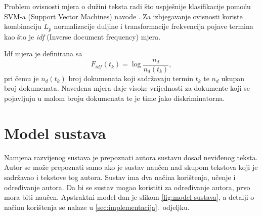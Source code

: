 \documentclass[11pt,english]{article}
\begin{document}
\begin{multicols}{2}
Problem ovisnosti mjera o dužini teksta radi što uspješnije klasifikacije pomoću
SVM-a (Support Vector Machines) navode \citet{diederich2003authorship}.
Za izbjegavanje ovisnosti koriste kombinaciju $L_p$ normalizacije duljine i
transformacije frekvencija pojave termina kao što je
\emph{idf} (Inverse document frequency) mjera.

Idf mjera je definirana sa
\begin{equation}
F_{idf}(t_k) = \log \frac{n_d}{n_d(t_k)},
\label{equ:idf}
\end{equation}
pri čemu je $n_d(t_k)$ broj dokumenata koji sadržavaju termin $t_k$ te $n_d$
ukupan broj dokumenata. Navedena mjera daje visoke vrijednosti za dokumente koji
se pojavljuju u malom broju dokumenata te je time jako diskriminatorna. 


\section{Model sustava}
Namjena razvijenog sustava je prepoznati autora sustavu dosad neviđenog teksta.
Autor se može prepoznati samo ako je sustav naučen nad skupom tekstova koji je
sadržavao i tekstove tog autora. Sustav ima dva načina korištenja, učenje i
određivanje autora. Da bi se sustav mogao koristiti za određivanje autora, prvo
mora biti naučen. Apstraktni model dan je slikom \ref{fig:model-sustava}, a
detalji o načinu korištenja se nalaze u \ref{sec:implementacija}.~odjeljku.


\end{multicols}
\end{document}
